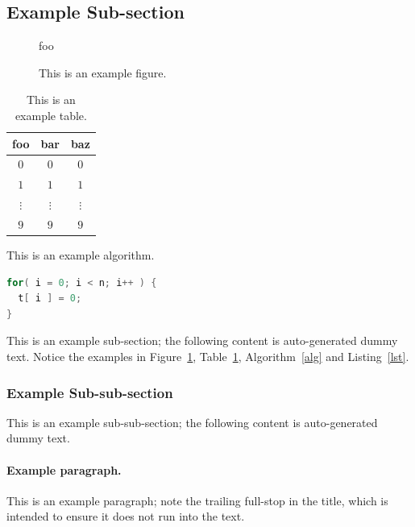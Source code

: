 \documentclass[ oneside,%
                    author={Joshua Felmeden},
                    degree={MEng},
                     title={Semantic Analysis of Financial Headlines Based on Realised Stock Returns},
                  subtitle={}]{dissertation}
\begin{document}
\subsection{Example Sub-section}

\begin{figure}[t]
\centering
foo
\caption{This is an example figure.}
\label{fig}
\end{figure}

\begin{table}[t]
\centering
\begin{tabular}{|cc|c|}
\hline
foo      & bar      & baz      \\
\hline
$0     $ & $0     $ & $0     $ \\
$1     $ & $1     $ & $1     $ \\
$\vdots$ & $\vdots$ & $\vdots$ \\
$9     $ & $9     $ & $9     $ \\
\hline
\end{tabular}
\caption{This is an example table.}
\label{tab}
\end{table}

\begin{algorithm}[t]
\caption{This is an example algorithm.}
\label{alg}
\end{algorithm}

\begin{lstlisting}[float={t},caption={This is an example listing.},label={lst},language=C]
for( i = 0; i < n; i++ ) {
  t[ i ] = 0;
}
\end{lstlisting}

This is an example sub-section;
the following content is auto-generated dummy text.
Notice the examples in Figure~\ref{fig}, Table~\ref{tab}, Algorithm~\ref{alg}
and Listing~\ref{lst}.
\lipsum

\subsubsection{Example Sub-sub-section}

This is an example sub-sub-section;
the following content is auto-generated dummy text.
\lipsum

\paragraph{Example paragraph.}

This is an example paragraph; note the trailing full-stop in the title,
which is intended to ensure it does not run into the text.
\end{document}
